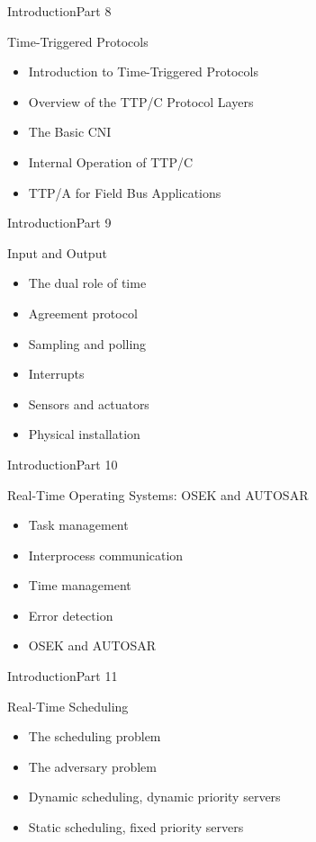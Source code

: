 \begin{frame}{Introduction}{Part 8}
    \begin{block}{Time-Triggered Protocols}
\begin{itemize}
\item
  Introduction to Time-Triggered Protocols
\item
  Overview of the TTP/C Protocol Layers
\item
  The Basic CNI
\item
  Internal Operation of TTP/C
\item
  TTP/A for Field Bus Applications
\end{itemize}
\end{block}
\end{frame}


\begin{frame}{Introduction}{Part 9}
    \begin{block}{Input and Output}
\begin{itemize}
\item
  The dual role of time
\item
  Agreement protocol
\item
  Sampling and polling
\item
  Interrupts
\item
  Sensors and actuators
\item
  Physical installation
\end{itemize}
\end{block}
\end{frame}


\begin{frame}{Introduction}{Part 10}
    \begin{block}{Real-Time Operating Systems: OSEK and AUTOSAR}
\begin{itemize}
\item
  Task management
\item
  Interprocess communication
\item
  Time management
\item
  Error detection
\item
  OSEK and AUTOSAR
\end{itemize}
\end{block}
\end{frame}


\begin{frame}{Introduction}{Part 11}
    \begin{block}{Real-Time Scheduling}
\begin{itemize}
\item
  The scheduling problem
\item
  The adversary problem
\item
  Dynamic scheduling, dynamic priority servers
\item
  Static scheduling, fixed priority servers
\end{itemize}
\end{block}
\end{frame}


